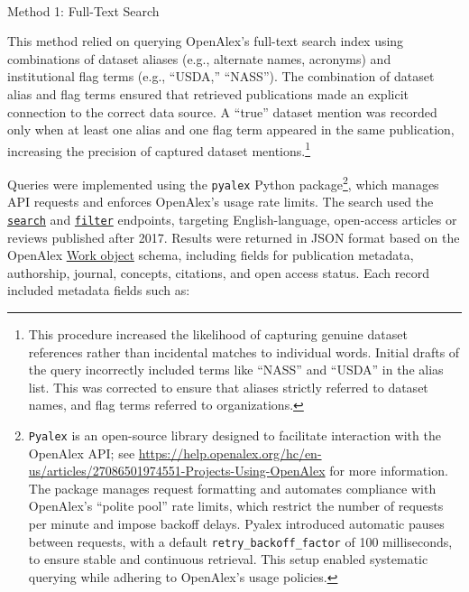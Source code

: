\documentclass[
  letterpaper,
  DIV=11,
  numbers=noendperiod]{scrartcl}
\makeatletter
\let\oldparagraph\paragraph
\renewcommand{\paragraph}{
    \@ifstar
      \xxxParagraphStar
      \xxxParagraphNoStar
  }
\newcommand{\xxxParagraphStar}[1]{\oldparagraph*{#1}\mbox{}}
\newcommand{\xxxParagraphNoStar}[1]{\oldparagraph{#1}\mbox{}}
\makeatother
\begin{document}
\paragraph{Method 1: Full-Text Search}\label{method-1-full-text-search}

This method relied on querying OpenAlex's full-text search index using
combinations of dataset aliases (e.g., alternate names, acronyms) and
institutional flag terms (e.g., ``USDA,'' ``NASS''). The combination of
dataset alias and flag terms ensured that retrieved publications made an
explicit connection to the correct data source. A ``true'' dataset
mention was recorded only when at least one alias and one flag term
appeared in the same publication, increasing the precision of captured
dataset mentions.\footnote{This procedure increased the likelihood of
  capturing genuine dataset references rather than incidental matches to
  individual words. Initial drafts of the query incorrectly included
  terms like ``NASS'' and ``USDA'' in the alias list. This was corrected
  to ensure that aliases strictly referred to dataset names, and flag
  terms referred to organizations.}

Queries were implemented using the \texttt{pyalex} Python
package\footnote{\texttt{Pyalex} is an open-source library designed to
  facilitate interaction with the OpenAlex API; see
  \url{https://help.openalex.org/hc/en-us/articles/27086501974551-Projects-Using-OpenAlex}
  for more information. The package manages request formatting and
  automates compliance with OpenAlex's ``polite pool'' rate limits,
  which restrict the number of requests per minute and impose backoff
  delays. Pyalex introduced automatic pauses between requests, with a
  default \texttt{retry\_backoff\_factor} of 100 milliseconds, to ensure
  stable and continuous retrieval. This setup enabled systematic
  querying while adhering to OpenAlex's usage policies.}, which manages
API requests and enforces OpenAlex's usage rate limits. The search used
the
\href{https://docs.openalex.org/api-entities/works/search-works}{\texttt{search}}
and
\href{https://docs.openalex.org/api-entities/works/filter-works}{\texttt{filter}}
endpoints, targeting English-language, open-access articles or reviews
published after 2017. Results were returned in JSON format based on the
OpenAlex
\href{https://docs.openalex.org/api-entities/works/work-object}{Work
object} schema, including fields for publication metadata, authorship,
journal, concepts, citations, and open access status. Each record
included metadata fields such as:
\end{document}
